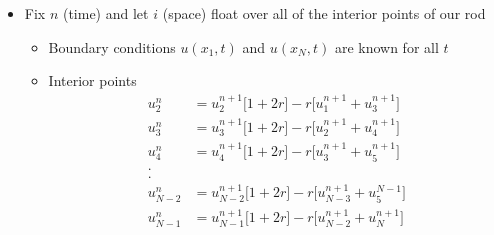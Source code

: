 \documentclass[compress]{beamer}
\begin{document}
\begin{frame}
\begin{itemize}
\item Fix $n$ (time) and let $i$ (space) float over all of the interior points of our rod
\begin{itemize}
\item Boundary conditions $u(x_1,t)$ and $u(x_N,t)$ are known for all $t$
\item Interior points
\begin{align*}
u_2^n	&=u_2^{n+1}\Big[1+2r\Big]-r\Big[u_{1}^{n+1}+u_{3}^{n+1}\Big] 	\\
u_3^n	&=u_3^{n+1}\Big[1+2r\Big]-r\Big[u_{2}^{n+1}+u_{4}^{n+1}\Big] 	\\
u_4^n	&=u_4^{n+1}\Big[1+2r\Big]-r\Big[u_{3}^{n+1}+u_{5}^{n+1}\Big] 	\\
.		&	\\
.		&	\\
u_{N-2}^n	&=u_{N-2}^{n+1}\Big[1+2r\Big]-r\Big[u_{N-3}^{n+1}+u_{5}^{N-1}\Big] 	\\
u_{N-1}^n	&=u_{N-1}^{n+1}\Big[1+2r\Big]-r\Big[u_{N-2}^{n+1}+u_{N}^{n+1}\Big] 	\\
\end{align*}
\end{itemize}
\end{itemize}
\end{frame}
\end{document}
